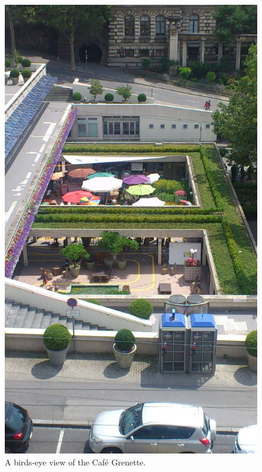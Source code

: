 \documentclass[a4paper,
fontsize=11pt,
oneside,
numbers=noperiodatend,
parskip=half-,
bibliography=totoc,
final
]{scrartcl}
\begin{document}
\begin{figure}[htbp]
\centering
\includegraphics{img/BlumerSchuldt05.jpg}
\caption{A birds-eye view of the Café Grenette.}
\end{figure}
\end{document}
